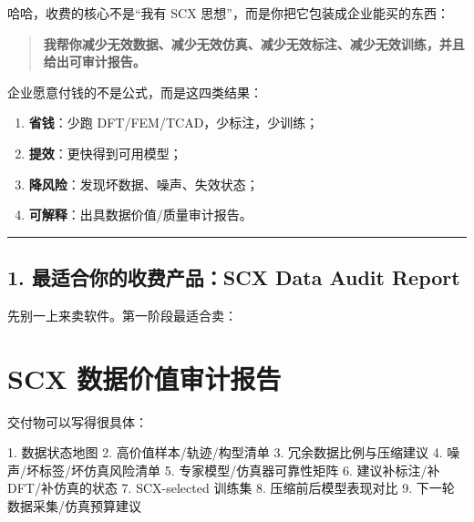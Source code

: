 \documentclass[
  12pt,
]{ctexart}
\newenvironment{Shaded}{}{}
\newcommand{\NormalTok}[1]{#1}
\providecommand{\tightlist}{%
  \setlength{\itemsep}{0pt}\setlength{\parskip}{0pt}}
\begin{document}
哈哈，收费的核心不是``我有 SCX 思想''，而是你把它包装成企业能买的东西：

\begin{quote}
\textbf{我帮你减少无效数据、减少无效仿真、减少无效标注、减少无效训练，并且给出可审计报告。}
\end{quote}

企业愿意付钱的不是公式，而是这四类结果：

\begin{enumerate}
\def\labelenumi{\arabic{enumi}.}
\tightlist
\item
  \textbf{省钱}：少跑 DFT/FEM/TCAD，少标注，少训练；
\item
  \textbf{提效}：更快得到可用模型；
\item
  \textbf{降风险}：发现坏数据、噪声、失效状态；
\item
  \textbf{可解释}：出具数据价值/质量审计报告。
\end{enumerate}

\begin{center}\rule{0.5\linewidth}{0.5pt}\end{center}

\subsection{1. 最适合你的收费产品：SCX Data Audit
Report}\label{ux6700ux9002ux5408ux4f60ux7684ux6536ux8d39ux4ea7ux54c1scx-data-audit-report}

先别一上来卖软件。第一阶段最适合卖：

\section{\texorpdfstring{\textbf{SCX
数据价值审计报告}}{SCX 数据价值审计报告}}\label{scx-ux6570ux636eux4ef7ux503cux5ba1ux8ba1ux62a5ux544a}

交付物可以写得很具体：

\begin{Shaded}
\begin{Highlighting}[]
\NormalTok{1. 数据状态地图}
\NormalTok{2. 高价值样本/轨迹/构型清单}
\NormalTok{3. 冗余数据比例与压缩建议}
\NormalTok{4. 噪声/坏标签/坏仿真风险清单}
\NormalTok{5. 专家模型/仿真器可靠性矩阵}
\NormalTok{6. 建议补标注/补 DFT/补仿真的状态}
\NormalTok{7. SCX{-}selected 训练集}
\NormalTok{8. 压缩前后模型表现对比}
\NormalTok{9. 下一轮数据采集/仿真预算建议}
\end{Highlighting}
\end{Shaded}
\end{document}
